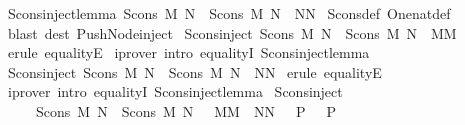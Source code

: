 \begin{isabellebody}
\isanewline
%
\endisadelimproof
\isanewline
{}\isamarkupfalse%
\ Scons{\isacharunderscore}inject{\isacharunderscore}lemma{}{\isacharcolon}\ {\isachardoublequoteopen}Scons\ M\ N\ {\isacharless}{\isacharequal}\ Scons\ M{\isacharprime}\ N{\isacharprime}\ {\isacharequal}{\isacharequal}{\isachargreater}\ N{\isacharless}{\isacharequal}N{\isacharprime}{\isachardoublequoteclose}\isanewline
%
\isadelimproof
%
\endisadelimproof
%
\isatagproof
{}\isamarkupfalse%
\ Scons{\isacharunderscore}def\ One{\isacharunderscore}nat{\isacharunderscore}def\isanewline
{}\isamarkupfalse%
\ {\isacharparenleft}blast\ dest{\isacharbang}{\isacharcolon}\ Push{\isacharunderscore}Node{\isacharunderscore}inject{\isacharparenright}%
\endisatagproof
{\isafoldproof}%
%
\isadelimproof
\isanewline
%
\endisadelimproof
\isanewline
{}\isamarkupfalse%
\ Scons{\isacharunderscore}inject{}{\isacharcolon}\ {\isachardoublequoteopen}Scons\ M\ N\ {\isacharequal}\ Scons\ M{\isacharprime}\ N{\isacharprime}\ {\isacharequal}{\isacharequal}{\isachargreater}\ M{\isacharequal}M{\isacharprime}{\isachardoublequoteclose}\isanewline
%
\isadelimproof
%
\endisadelimproof
%
\isatagproof
{}\isamarkupfalse%
\ {\isacharparenleft}erule\ equalityE{\isacharparenright}\isanewline
{}\isamarkupfalse%
\ {\isacharparenleft}iprover\ intro{\isacharcolon}\ equalityI\ Scons{\isacharunderscore}inject{\isacharunderscore}lemma{}{\isacharparenright}\isanewline
{}\isamarkupfalse%
%
\endisatagproof
{\isafoldproof}%
%
\isadelimproof
\isanewline
%
\endisadelimproof
\isanewline
{}\isamarkupfalse%
\ Scons{\isacharunderscore}inject{}{\isacharcolon}\ {\isachardoublequoteopen}Scons\ M\ N\ {\isacharequal}\ Scons\ M{\isacharprime}\ N{\isacharprime}\ {\isacharequal}{\isacharequal}{\isachargreater}\ N{\isacharequal}N{\isacharprime}{\isachardoublequoteclose}\isanewline
%
\isadelimproof
%
\endisadelimproof
%
\isatagproof
{}\isamarkupfalse%
\ {\isacharparenleft}erule\ equalityE{\isacharparenright}\isanewline
{}\isamarkupfalse%
\ {\isacharparenleft}iprover\ intro{\isacharcolon}\ equalityI\ Scons{\isacharunderscore}inject{\isacharunderscore}lemma{}{\isacharparenright}\isanewline
{}\isamarkupfalse%
%
\endisatagproof
{\isafoldproof}%
%
\isadelimproof
\isanewline
%
\endisadelimproof
\isanewline
{}\isamarkupfalse%
\ Scons{\isacharunderscore}inject{\isacharcolon}\isanewline
\ \ \ \ {\isachardoublequoteopen}{\isacharbrackleft}{\isacharbar}\ Scons\ M\ N\ {\isacharequal}\ Scons\ M{\isacharprime}\ N{\isacharprime}{\isacharsemicolon}\ \ {\isacharbrackleft}{\isacharbar}\ M{\isacharequal}M{\isacharprime}{\isacharsemicolon}\ \ N{\isacharequal}N{\isacharprime}\ {\isacharbar}{\isacharbrackright}\ {\isacharequal}{\isacharequal}{\isachargreater}\ P\ {\isacharbar}{\isacharbrackright}\ {\isacharequal}{\isacharequal}{\isachargreater}\ P{\isachardoublequoteclose}\isanewline

\end{isabellebody}
